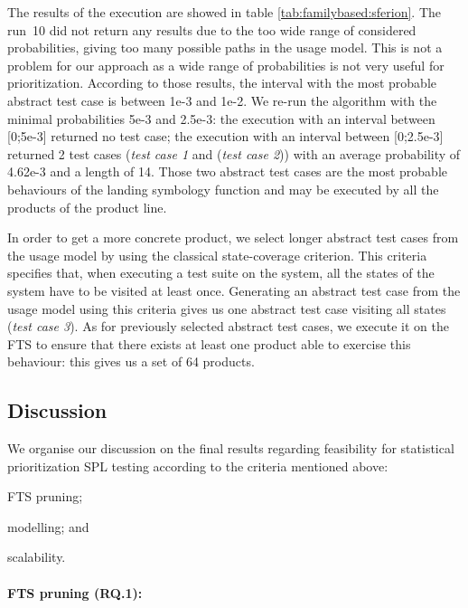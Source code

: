 The results of the execution are showed in table \ref{tab:familybased:sferion}. The run~10 did not return any results due to the too wide range of considered probabilities, giving too many possible paths in the usage model. This is not a problem for our approach as a wide range of probabilities is not very useful for prioritization. According to those results, the interval with the most probable abstract test case is between 1e-3 and 1e-2. We re-run the algorithm with the minimal probabilities 5e-3 and 2.5e-3: the execution with an interval between [0;5e-3] returned no test case; the execution with an interval between [0;2.5e-3] returned 2 test cases (\textit{test case 1} and (\textit{test case 2})) with an average probability of 4.62e-3 and a length of 14. Those two abstract test cases are the most probable behaviours of the landing symbology function and may be executed by all the products of the product line.

In order to get a more concrete product, we select longer abstract test cases from the usage model by using the classical state-coverage criterion\cite{Mathur2008}. This criteria specifies that, when executing a test suite on the system, all the states of the system have to be visited at least once. Generating an abstract test case from the usage model using this criteria gives us one abstract test case visiting all states (\textit{test case 3}). As for previously selected abstract test cases, we execute it on the FTS to ensure that there exists at least one product able to exercise this behaviour: this gives us a set of 64 products.


\subsection{Discussion}

We organise our discussion on the final results regarding feasibility for statistical prioritization SPL testing according to the criteria mentioned above:
\begin{inparaenum}[(i)]
\item FTS pruning; 
\item modelling; and 
\item scalability.
\end{inparaenum}


\paragraph{FTS pruning (RQ.1):}  

